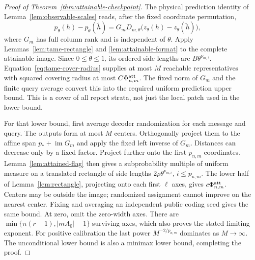 \documentclass[11pt]{amsart}
\theoremstyle{definition}\newtheorem{definition}[theorem]{Definition}
\theoremstyle{remark}\newtheorem{remark}[theorem]{Remark}
\begin{document}
\begin{proof}[Proof of Theorem~\ref{thm:attainable-checkpoint}]
The physical prediction identity of Lemma~\ref{lem:observable-scales}
reads, after the fixed coordinate permutation,
\begin{equation}\label{eq:flag-query-metric}
 p_\theta(h)-p_\theta(\widetilde h)
 =G_mD_{m,\theta}\bigl(z_\theta(h)-z_\theta(\widetilde h)\bigr),
\end{equation}
where $G_m$ has full column rank and is independent of $\theta$.
Apply Lemmas~\ref{lem:tame-rectangle} and
\ref{lem:attainable-format} to the complete attainable image. Since
$0\le\theta\le1$, its ordered side lengths are
$B\theta^{\nu_{m,i}}$. Equation~\eqref{eq:tame-cover-radius} supplies
at most $M$ reachable representatives with squared covering radius
at most $C\Phi^{\rm att}_{n,m}$. The fixed norm of $G_m$ and the
finite query average convert this into the required uniform prediction
upper bound. This is a cover of all report strata, not just the local
patch used in the lower bound.

For that lower bound, first average decoder randomization for each
message and query. The outputs form at most $M$ centers. Orthogonally
project them to the affine span $p_*+\operatorname{im}G_m$ and apply
the fixed left inverse of $G_m$. Distances can decrease only by a
fixed factor. Project further onto the first $p_{n,m}$ coordinates.
Lemma~\ref{lem:attained-flag} then gives a subprobability multiple of
uniform measure on a translated rectangle of side lengths
$2\rho\theta^{\nu_{m,i}}$, $i\le p_{n,m}$. The lower half of
Lemma~\ref{lem:rectangle}, projecting onto each first $\ell$ axes,
gives $c\Phi^{\rm att}_{n,m}$. Centers may be outside the image;
randomized assignment cannot improve on the nearest center. Fixing and
averaging an independent public coding seed gives the same bound.
At zero, omit the zero-width axes. There are
$\min\{n(r-1),|mA_0|-1\}$ surviving axes, which also proves the
stated limiting exponent. For positive calibration the last power
$M^{-2/p_{n,m}}$ dominates as $M\to\infty$. The unconditional lower
bound is also a minimax lower bound, completing the proof.
\end{proof}
\end{document}
